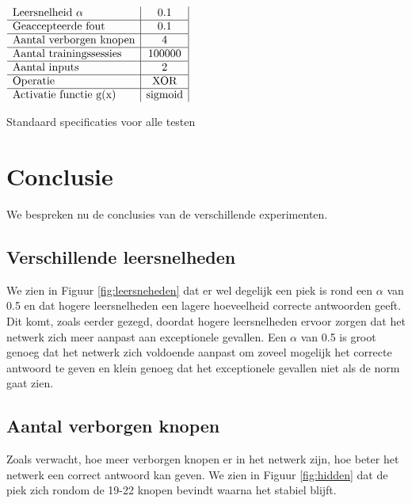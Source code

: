 \documentclass[10pt]{article}
\begin{document}
\begin{table}[ht]
    \centering
      $\begin{array}{ l | c | c}
        \text{Leersnelheid } \alpha & 0.1 \\ \hline
        \text{Geaccepteerde fout} & 0.1 \\  \hline
        \text{Aantal verborgen knopen} & 4 \\  \hline
        \text{Aantal trainingssessies} & 100000 \\  \hline
        \text{Aantal inputs} & 2 \\  \hline
        \text{Operatie} & \text{XOR} \\  \hline
        \text{Activatie functie g(x)} & \text{sigmoid} 
      \end{array}$
    \caption{Standaard specificaties voor alle testen}
    \label{tab:my_label}
\end{table}









\section{Conclusie}
We bespreken nu de conclusies van de verschillende experimenten.

\subsection{Verschillende leersnelheden}
We zien in Figuur \ref{fig:leersneheden} dat er wel degelijk een piek is rond een $\alpha$ van 0.5 en dat hogere leersnelheden een lagere hoeveelheid correcte antwoorden geeft. Dit komt, zoals eerder gezegd, doordat hogere leersnelheden ervoor zorgen dat het netwerk zich meer aanpast aan exceptionele gevallen. Een $\alpha$ van 0.5 is groot genoeg dat het netwerk zich voldoende aanpast om zoveel mogelijk het correcte antwoord te geven en klein genoeg dat het exceptionele gevallen niet als de norm gaat zien.

\subsection{Aantal verborgen knopen}
Zoals verwacht, hoe meer verborgen knopen er in het netwerk zijn, hoe beter het netwerk een correct antwoord kan geven. We zien in Figuur \ref{fig:hidden} dat de piek zich rondom de 19-22 knopen bevindt waarna het stabiel blijft. 
\end{document}
